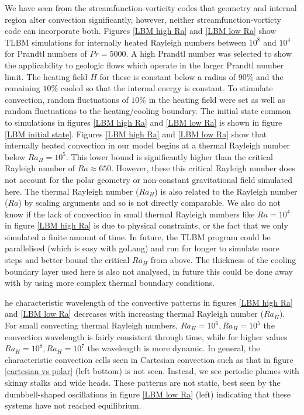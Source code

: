 \documentclass{article}
\begin{document}
\noindent We have seen from the streamfunction-vorticity codes that geometry and internal region alter convection significantly, however, neither 
streamfunction-vorticty code can incorporate both. Figures \ref{LBM high Ra} and \ref{LBM low Ra} show TLBM simulations for internally heated Rayleigh 
numbers between $10^8$ and $10^4$ for Prandtl numbers of $Pr=5000$. A high Prandtl number was selected to show the applicability to geologic flows which operate in the larger Prandtl number limit. The heating field $H$ for these is constant below a radius of $90 \%$ and the 
remaining $10\%$ cooled so that the internal energy is constant. To stimulate convection, random fluctuations of $10 \%$ in the heating field were set as well as random fluctuations to the heating/cooling boundary. The initial state common to simulations in figures \ref{LBM high Ra} and \ref{LBM low Ra} is shown in figure \ref{LBM initial state}. 
\newline
\noindent Figures \ref{LBM high Ra} and \ref{LBM low Ra} show that internally heated convection in our model begins at a thermal Rayleigh number below 
$Ra_H=10^5$. This lower bound is significantly higher than the critical Rayleigh number of $Ra\approx650$. However, these this critical Rayleigh number does not 
account for the polar geometry or non-constant gravitational field simulated here. The thermal Rayleigh number ($Ra_H$) is also related to the Rayleigh 
number ($Ra$) by scaling arguments and so is not directly comparable. We also do not know if the lack of convection in small thermal Rayleigh numbers 
like $Ra=10^4$ in figure \ref{LBM high Ra} is due to physical constraints, or the fact that we only simulated a finite amount of time. In future, the 
TLBM program could be parallelised (which is easy with goLang) and run for longer to simulate more steps and better bound the critical $Ra_H$ from above. The thickness of the cooling boundary layer used here is also not analysed, in future this could be done away with by using more complex thermal boundary conditions.  

\noindent he characteristic wavelength of the convective patterns in figures \ref{LBM high Ra} and \ref{LBM low Ra} decreases with increasing thermal Rayleigh number ($Ra_H$). For small convecting thermal Rayleigh numbers, $Ra_H=10^6, Ra_H=10^5$ the convection wavelength is fairly consistent through time, while for higher values $Ra_H=10^8,Ra_H=10^7$ the wavelength is more dynamic. In general, the characteristic convection cells seen in Cartesian convection such as that in figure \ref{cartesian vs polar} (left bottom) is not seen. Instead, we see periodic plumes with skinny stalks and wide heads. These patterns are not static, best seen by the dumbbell-shaped oscillations in figure \ref{LBM low Ra} (left) indicating that these systems have not reached equilibrium. 
\end{document}
